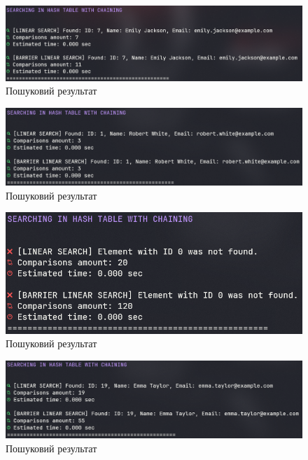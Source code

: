 \begin{figure}[h!]
  \centering
  \includegraphics[width=15cm]{reports/algos/lab10/assets/s1.png}
  \caption{Пошуковий результат}
\end{figure}

\begin{figure}[h!]
  \centering
  \includegraphics[width=15cm]{reports/algos/lab10/assets/s2.png}
  \caption{Пошуковий результат}
\end{figure}

\begin{figure}[h!]
  \centering
  \includegraphics[width=15cm]{reports/algos/lab10/assets/s3.png}
  \caption{Пошуковий результат}
\end{figure}

\begin{figure}[h!]
  \centering
  \includegraphics[width=15cm]{reports/algos/lab10/assets/s4.png}
  \caption{Пошуковий результат}
\end{figure}

